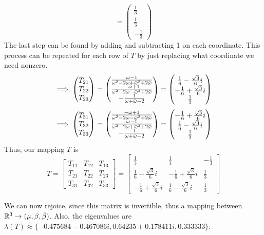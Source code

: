\begin{solution}
\[= 
\begin{pmatrix}\frac{1}{3}\\ \frac{1}{3} \\ -\frac{1}{3}\end{pmatrix}
\]
The last step can be found by adding and subtracting 1 on each coordinate. This process can be repeated for each row of $T$ by just replacing what coordinate we need nonzero.
\[
\implies \begin{pmatrix}T_{21}\\ T_{22} \\ T_{23}\end{pmatrix}
= 
\begin{pmatrix}\frac{\omega - 1}{\omega^2 - 2\omega + \Bar{\omega}^2 + 2\Bar{\omega}} \\ \frac{-\Bar{\omega} + 1}{\omega^2 - 2\omega - \Bar{\omega}^2 + 2\Bar{\omega}}\\ -\frac{1}{\omega + \Bar{\omega} - 2} \end{pmatrix}
=
\begin{pmatrix}
    \frac{1}{6} - \frac{\sqrt{3}}{6}i \\ -\frac{1}{6} + \frac{\sqrt{3}}{6}i \\ \frac{1}{3} 
\end{pmatrix}
\]
\[
\implies \begin{pmatrix}T_{31}\\ T_{32} \\ T_{33}\end{pmatrix}
= 
\begin{pmatrix} \frac{-\Bar{\omega} + 1}{\omega^2 - 2\omega - \Bar{\omega}^2 + 2\Bar{\omega}} \\ \frac{\omega - 1}{\omega^2 - 2\omega + \Bar{\omega}^2 + 2\Bar{\omega}} \\ -\frac{1}{\omega + \Bar{\omega} - 2} \end{pmatrix}
=
\begin{pmatrix}
    -\frac{1}{6} + \frac{\sqrt{3}}{6}i \\ \frac{1}{6} - \frac{\sqrt{3}}{6}i \\ \frac{1}{3} 
\end{pmatrix}
\]
Thus, our mapping $T$ is 
\[
T 
= 
\begin{bmatrix}
    T_{11} &T_{12} &T_{13}\\
    T_{21} &T_{22} &T_{23}\\
    T_{31} &T_{32} &T_{33}
\end{bmatrix}
= 
\begin{bmatrix}
    \frac{1}{3} &\frac{1}{3} &-\frac{1}{3}\\
    \frac{1}{6} - \frac{\sqrt{3}}{6}i &-\frac{1}{6} + \frac{\sqrt{3}}{6}i &\frac{1}{3}\\
    -\frac{1}{6} + \frac{\sqrt{3}}{6}i &\frac{1}{6} - \frac{\sqrt{3}}{6}i &\frac{1}{3}
\end{bmatrix}
\]

\jump
We can now rejoice, since this matrix is invertible, thus a mapping between $\mathbb{R}^3 \rightarrow (\mu, \beta, \Bar{\beta})$. Also, the eigenvalues are $\lambda(T) \approx \{-0.475684 - 0.467086 i, 0.64235 + 0.178411i, 0.333333\}$. 
\end{solution}

